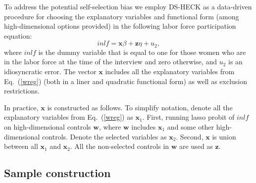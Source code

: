 \documentclass[11pt]{article}
\begin{document}
To address the potential self-selection bias %
we employ DS-HECK %
as a data-driven procedure for choosing the explanatory variables and functional
form (among high-dimensional options provided) %
in the following
labor force participation equation: 
\begin{equation}
inlf=\mathbf{x}\beta+\mathbf{z}\eta+u_2,\label{probit}
\end{equation}
where $inlf$ is the dummy variable that is equal to one for those women who are
in the labor force at the time of the interview and zero otherwise, and $u_2$ is
an idiosyncratic error. The vector $\mathbf{x}$ includes all the explanatory
variables from Eq.~(\ref{wreg}) (both in a liner and quadratic
functional form) as well as exclusion restrictions.  

In practice, $\mathbf{x}$ is constructed as follows. To simplify notation,
denote all the explanatory variables from Eq.~(\ref{wreg}) as $\mathbf{x}_1$.
First, running lasso probit of $inlf$ on high-dimensional controls $\mathbf{w}$,
where $\mathbf{w}$ includes $\mathbf{x}_1$ and some other high-dimensional
controls.  Denote the selected variables as $\mathbf{x}_2$. Second, $\mathbf{x}$
is union between all $\mathbf{x}_1$ and $\mathbf{x}_2$. All the non-selected
controls in $\mathbf{w}$ are used as $\mathbf{z}$.


\subsection{Sample construction}
\end{document}
